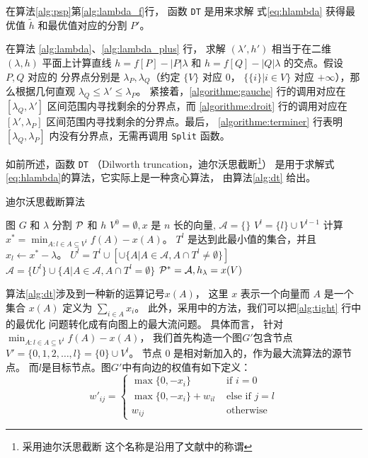 在算法\ref{alg:psp}第\ref{alg:lambda_f}行，
函数 \texttt{DT} 是用来求解 式\ref{eq:hlambda} 获得最优值
$\tilde{h}$ 和最优值对应的分割 $P'$。

在算法 \ref{alg:lambda}、\ref{alg:lambda_plus} 行，
求解 $(\lambda', h')$ 相当于在二维 $(\lambda, h)$
平面上计算直线
$h = f[P] - |P| \lambda $
和 $h = f[Q] - |Q| \lambda $ 的交点。假设 $P, Q$ 对应的
分界点分别是 $\lambda_P, \lambda_Q$（约定 $\{V\}$ 对应 0，
$\{\{i\}|i\in V\}$ 对应 $+\infty$），那么根据几何直观
$\lambda_Q \leq \lambda' \leq \lambda_P$。
紧接着，\ref{algorithme:gauche} 行的调用对应在
$[\lambda_Q, \lambda']$
区间范围内寻找剩余的分界点，而
\ref{algorithme:droit} 行的调用对应在
$[\lambda', \lambda_P]$
区间范围内寻找剩余的分界点。最后，
\ref{algorithme:terminer} 行表明
$[\lambda_Q, \lambda_P]$ 内没有分界点，无需再调用
\texttt{Split} 函数。

如前所述，函数 \texttt{DT}
（Dilworth truncation，迪尔沃思截断\footnote{采用迪尔沃思截断
这个名称是沿用了文献\cite{mac}中的称谓}）
是用于求解式\eqref{eq:hlambda}的算法，它实际上是一种贪心算法，
由算法\ref{alg:dt} 给出。

\begin{algorithm}
  \caption{迪尔沃思截断算法}\label{alg:dt}
  \begin{algorithmic}[1]
  \REQUIRE 图 $G$ 和 $\lambda$
  \ENSURE 分割 $\P$ 和 $h$
  \STATE
  $V^0 = \emptyset, x $ 是 $n$ 长的向量\footnotemark,
  $\mathcal{A} = \{\}$
  \STATE $V^l = \{l\} \cup V^{l-1}$
  \STATE\label{alg:tight} 计算 $x^* = \displaystyle\min_{ A: l \in A \subseteq V^l} f(A)- x(A)$。
   $T^l$ 是达到此最小值的集合，并且 $x_l \leftarrow x^* - \lambda$。 
    \STATE $U^l = T^l \cup [\cup \{A | A \in \mathcal{A}, A \cap T^l \neq \emptyset\}] $
  \STATE $\mathcal{A} = \{U^l\} \cup \{A | A \in \mathcal{A}, A \cap T^l = \emptyset \}$
  \ENDFOR
  \STATE $\P^* = \mathcal{A}, h_{\lambda} = x(V)$
  \end{algorithmic}
  \end{algorithm}

算法\ref{alg:dt}涉及到一种新的运算记号$x(A)$，
这里 $x$ 表示一个向量而 $A$ 是一个集合
$x(A)$ 定义为 $\sum_{i \in A} x_i$。
此外，采用\cite{pin}中的方法，我们可以把\ref{alg:tight} 行中的最优化
问题转化成有向图上的最大流问题。
具体而言，
针对 $\displaystyle\min_{ A: l \in A \subseteq V^l} f(A)- x(A)$，
我们首先构造一个图$G'$包含节点$V'=\{0, 1, 2, \dots, l\}=\{0\} \cup V^l$。
节点 $0$ 是相对新加入的，作为最大流算法的源节点。
而$l$是目标节点。图$G'$中有向边的权值有如下定义：
\begin{equation}\label{eq:wij_prime}
  w'_{ij} = \begin{cases}
    \max\{0, -x_{i}\} & \textrm{ if } i = 0 \\
    \max\{0, -x_{i}\} + w_{il} & \textrm{ else if } j = l \\
    w_{ij} & \textrm{ otherwise }
  \end{cases}
\end{equation}

